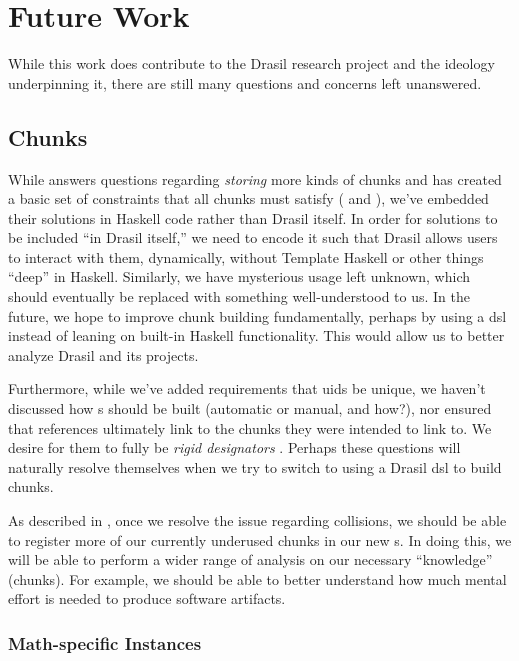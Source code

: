 \chapter{Future Work}
\label{chap:futureWork}

While this work does contribute to the Drasil research project and the ideology
underpinning it, there are still many questions and concerns left unanswered.

\section{Chunks}

While  answers questions regarding \textit{storing}
more kinds of chunks and has created a basic set of constraints that all chunks
must satisfy (\HasUID{} and \HasChunkRefs{}), we've embedded their solutions in
Haskell code rather than Drasil itself. In order for solutions to be included
``in Drasil itself,'' we need to encode it such that Drasil allows users to
interact with them, dynamically, without Template
Haskell\cite{GHC2020TemplateHaskell} or other things ``deep'' in Haskell.
Similarly, we have mysterious \Typeable{} usage left unknown, which should
eventually be replaced with something well-understood to us. In the future, we
hope to improve chunk building fundamentally, perhaps by using a \acs{dsl}
instead of leaning on built-in Haskell functionality. This would allow us to
better analyze Drasil and its projects.

Furthermore, while we've added requirements that \acsp{uid} be unique, we
haven't discussed how \UID{}s should be built (automatic or manual, and how?),
nor ensured that \UID{} references ultimately link to the chunks they were
intended to link to. We desire for them to fully be \textit{rigid designators}
\cite{Kripke1972NandN}. Perhaps these questions will naturally resolve
themselves when we try to switch to using a Drasil \acs{dsl} to build chunks.

As described in , once we resolve the issue regarding
\UID{} collisions, we should be able to register more of our currently underused
chunks in our new \ChunkDB{}s. In doing this, we will be able to perform a wider
range of analysis on our necessary ``knowledge'' (chunks). For example, we
should be able to better understand how much mental effort is needed to produce
software artifacts.

\subsection{Math-specific Instances}

